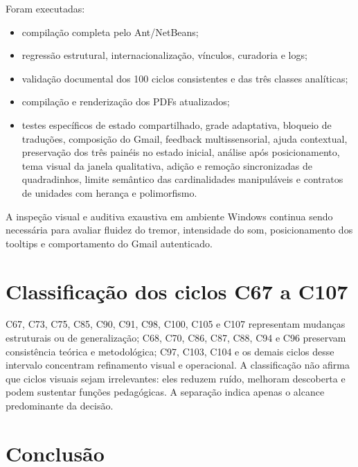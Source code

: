 \documentclass[12pt,a4paper]{article}
\begin{document}
Foram executadas:
\begin{itemize}[noitemsep]
  \item compilação completa pelo Ant/NetBeans;
  \item regressão estrutural, internacionalização, vínculos, curadoria e logs;
  \item validação documental dos 100 ciclos consistentes e das três classes analíticas;
  \item compilação e renderização dos PDFs atualizados;
  \item testes específicos de estado compartilhado, grade adaptativa, bloqueio de traduções, composição do Gmail, feedback multissensorial, ajuda contextual, preservação dos três painéis no estado inicial, análise após posicionamento, tema visual da janela qualitativa, adição e remoção sincronizadas de quadradinhos, limite semântico das cardinalidades manipuláveis e contratos de unidades com herança e polimorfismo.
\end{itemize}

A inspeção visual e auditiva exaustiva em ambiente Windows continua sendo necessária para avaliar fluidez do tremor, intensidade do som, posicionamento dos tooltips e comportamento do Gmail autenticado.

\section{Classificação dos ciclos C67 a C107}

C67, C73, C75, C85, C90, C91, C98, C100, C105 e C107 representam mudanças estruturais ou de generalização; C68, C70, C86, C87, C88, C94 e C96 preservam consistência teórica e metodológica; C97, C103, C104 e os demais ciclos desse intervalo concentram refinamento visual e operacional. A classificação não afirma que ciclos visuais sejam irrelevantes: eles reduzem ruído, melhoram descoberta e podem sustentar funções pedagógicas. A separação indica apenas o alcance predominante da decisão.

\section{Conclusão}
\end{document}
